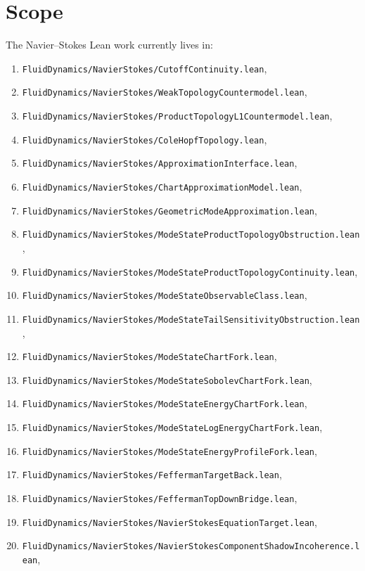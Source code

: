 \documentclass[11pt]{article}
\begin{document}
\section{Scope}

The Navier--Stokes Lean work currently lives in:
\begin{enumerate}[leftmargin=1.5em]
  \item \texttt{FluidDynamics/NavierStokes/CutoffContinuity.lean},
  \item \texttt{FluidDynamics/NavierStokes/WeakTopologyCountermodel.lean},
  \item \texttt{FluidDynamics/NavierStokes/ProductTopologyL1Countermodel.lean},
  \item \texttt{FluidDynamics/NavierStokes/ColeHopfTopology.lean},
  \item \texttt{FluidDynamics/NavierStokes/ApproximationInterface.lean},
  \item \texttt{FluidDynamics/NavierStokes/ChartApproximationModel.lean},
  \item \texttt{FluidDynamics/NavierStokes/GeometricModeApproximation.lean},
  \item \texttt{FluidDynamics/NavierStokes/ModeStateProductTopologyObstruction.lean},
  \item \texttt{FluidDynamics/NavierStokes/ModeStateProductTopologyContinuity.lean},
  \item \texttt{FluidDynamics/NavierStokes/ModeStateObservableClass.lean},
  \item \texttt{FluidDynamics/NavierStokes/ModeStateTailSensitivityObstruction.lean},
  \item \texttt{FluidDynamics/NavierStokes/ModeStateChartFork.lean},
  \item \texttt{FluidDynamics/NavierStokes/ModeStateSobolevChartFork.lean},
  \item \texttt{FluidDynamics/NavierStokes/ModeStateEnergyChartFork.lean},
  \item \texttt{FluidDynamics/NavierStokes/ModeStateLogEnergyChartFork.lean},
  \item \texttt{FluidDynamics/NavierStokes/ModeStateEnergyProfileFork.lean},
  \item \texttt{FluidDynamics/NavierStokes/FeffermanTargetBack.lean},
  \item \texttt{FluidDynamics/NavierStokes/FeffermanTopDownBridge.lean},
  \item \texttt{FluidDynamics/NavierStokes/NavierStokesEquationTarget.lean},
  \item \texttt{FluidDynamics/NavierStokes/NavierStokesComponentShadowIncoherence.lean},

\end{enumerate}
\end{document}
